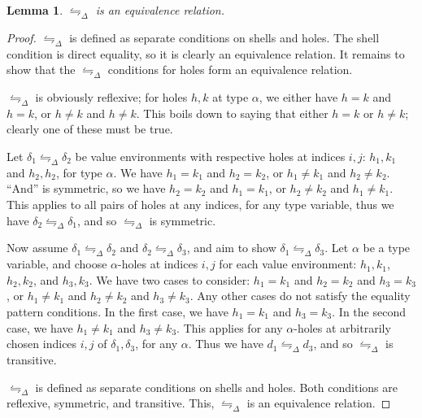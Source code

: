 \documentclass{report}
\newtheorem{lemma}{Lemma}
\theoremstyle{definition}
\newcommand{\eqpat}{\leftrightharpoons}
\newcommand{\eqpatD}{\eqpat_{\Delta}}
\begin{document}
\begin{lemma}
	\label{lem:eqpat-equivrel}
	\(\eqpatD\) is an equivalence relation.
\end{lemma}
\begin{proof}
	\(\eqpatD\) is defined as separate conditions on shells and holes.
	The shell condition is direct equality, so it is clearly an equivalence relation.
	It remains to show that the \(\eqpatD\) conditions for holes form an equivalence relation.

	\(\eqpatD\) is obviously reflexive; for holes \(h, k\) at type \(\alpha\), we either have \(h = k\) and \(h = k\), or \(h \ne k\) and \(h \ne k\).
	This boils down to saying that either \(h = k\) or \(h \ne k\); clearly one of these must be true.

	Let \(\delta_1 \eqpatD \delta_2\) be value environments with respective holes at indices \(i, j\): \(h_1, k_1\) and \(h_2, h_2\), for type \(\alpha\).
	We have \(h_1 = k_1\) and \(h_2 = k_2\), or \(h_1 \ne k_1\) and \(h_2 \ne k_2\).
	``And'' is symmetric, so we have \(h_2 = k_2\) and \(h_1 = k_1\), or \(h_2 \ne k_2\) and \(h_1 \ne k_1\).
	This applies to all pairs of holes at any indices, for any type variable, thus we have \(\delta_2 \eqpatD \delta_1\), and so \(\eqpatD\) is symmetric.

	Now assume \(\delta_1 \eqpatD \delta_2\) and \(\delta_2 \eqpatD \delta_3\), and aim to show \(\delta_1 \eqpatD \delta_3\).
	Let \(\alpha\) be a type variable, and choose \(\alpha\)-holes at indices \(i, j\) for each value environment: \(h_1, k_1\), \(h_2, k_2\), and \(h_3, k_3\).
	We have two cases to consider: \(h_1 = k_1\) and \(h_2 = k_2\) and \(h_3 = k_3\), or \(h_1 \ne k_1\) and \(h_2 \ne k_2\) and \(h_3 \ne k_3\).
	Any other cases do not satisfy the equality pattern conditions.
	In the first case, we have \(h_1 = k_1\) and \(h_3 = k_3\).
	In the second case, we have \(h_1 \ne k_1\) and \(h_3 \ne k_3\).
	This applies for any \(\alpha\)-holes at arbitrarily chosen indices \(i, j\) of \(\delta_1, \delta_3\), for any \(\alpha\).
	Thus we have \(d_1 \eqpatD d_3\), and so \(\eqpatD\) is transitive.

	\(\eqpatD\) is defined as separate conditions on shells and holes.
	Both conditions are reflexive, symmetric, and transitive.
	This, \(\eqpatD\) is an equivalence relation.
\end{proof}
\end{document}
